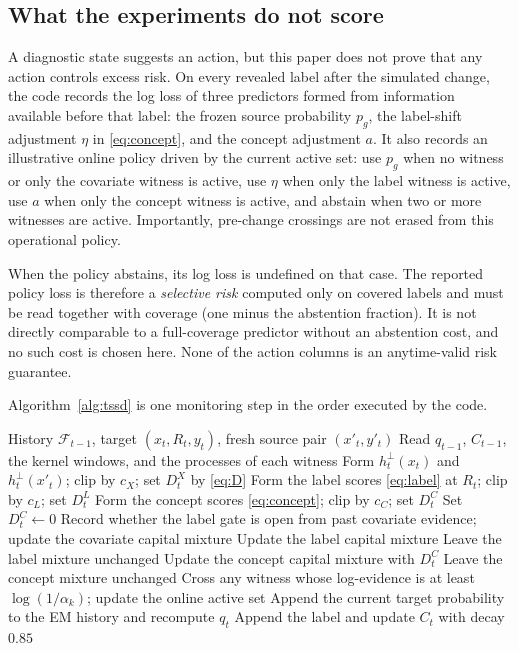 \documentclass[11pt,a4paper]{article}
\theoremstyle{definition}
\newcommand{\cF}{\mathcal{F}}
\newcommand{\1}{\mathbf{1}}
\begin{document}
\subsection{What the experiments do not score}
\label{sec:action}

A diagnostic state suggests an action, but this paper does not prove that any action controls excess risk. On every revealed label after the simulated change, the code records the log loss of three predictors formed from information available before that label: the frozen source probability \(p_g\), the label-shift adjustment \(\eta\) in \eqref{eq:concept}, and the concept adjustment \(a\). It also records an illustrative online policy driven by the current active set: use \(p_g\) when no witness or only the covariate witness is active, use \(\eta\) when only the label witness is active, use \(a\) when only the concept witness is active, and abstain when two or more witnesses are active. Importantly, pre-change crossings are not erased from this operational policy.

When the policy abstains, its log loss is undefined on that case. The reported policy loss is therefore a \emph{selective risk} computed only on covered labels and must be read together with coverage (one minus the abstention fraction). It is not directly comparable to a full-coverage predictor without an abstention cost, and no such cost is chosen here. None of the action columns is an anytime-valid risk guarantee.

Algorithm~\ref{alg:tssd} is one monitoring step in the order executed by the code.

\begin{algorithm}[t]
\caption{One TSSD step. State used in the scores is from before time \(t\).}
\label{alg:tssd}
\begin{algorithmic}[1]
\Require History \(\cF_{t-1}\), target \((x_t,R_t,y_t)\), fresh source pair \((x'_t,y'_t)\)
\State Read \(q_{t-1}\), \(C_{t-1}\), the kernel windows, and the processes of each witness
\State Form \(h^\perp_t(x_t)\) and \(h^\perp_t(x'_t)\); clip by \(c_X\); set \(D^X_t\) by \eqref{eq:D}
\State Form the label scores \eqref{eq:label} at \(R_t\); clip by \(c_L\); set \(D^L_t\)
  \State Form the concept scores \eqref{eq:concept}; clip by \(c_C\); set \(D^C_t\)
\Else
  \State Set \(D^C_t\gets 0\)
\EndIf
\State Record whether the label gate is open from past covariate evidence; update the covariate capital mixture
  \State Update the label capital mixture
\Else
  \State Leave the label mixture unchanged
\EndIf
{}
  \State Update the concept capital mixture with \(D^C_t\)
\Else
  \State Leave the concept mixture unchanged
\EndIf
\State Cross any witness whose log-evidence is at least \(\log(1/\alpha_k)\); update the online active set
\State Append the current target probability to the EM history and recompute \(q_t\)
  \State Append the label and update \(C_t\) with decay \(0.85\)
\EndIf
\end{algorithmic}
\end{algorithm}
\end{document}
